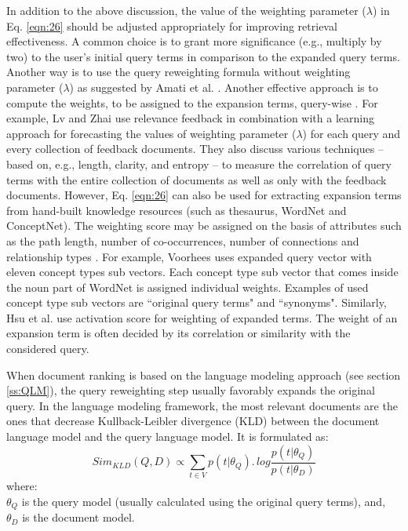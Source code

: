 In addition to the above discussion, the value of the weighting parameter ($\lambda$) in Eq. \ref{eqn:26} should be adjusted appropriately for improving retrieval effectiveness. A common choice is to grant more  significance  (e.g., multiply by two) to the user's initial query terms in comparison to the expanded query terms. Another way is to use the query reweighting formula without weighting parameter ($\lambda$) as suggested by Amati et al. \cite{amati2003probabilistic}. Another effective approach is to compute the weights, to be assigned to the expansion terms, query-wise . For example, Lv and Zhai \cite{lv2009positional,lv2010positional} use relevance feedback in combination with a learning approach for forecasting the values of weighting parameter ($\lambda$) for each query and every collection of feedback documents.  They also discuss various techniques -- based on, e.g., length, clarity, and entropy -- to measure the correlation of query terms with the entire collection of documents as well as only with the feedback documents.  
However, Eq. \ref{eqn:26} can also be used for extracting expansion terms from hand-built knowledge resources (such as thesaurus, WordNet and ConceptNet). The weighting score may be assigned on the basis of attributes such as the path length, number of co-occurrences, number of connections and relationship types \cite{jones1995interactive}. For example, Voorhees \cite{voorhees1994query} uses expanded query vector with  eleven concept types sub vectors. Each concept type sub vector that comes inside the noun part of WordNet is assigned individual weights. Examples of used concept type sub vectors are ``original query terms" and ``synonyms". Similarly, Hsu et al. \cite{hsu2008combining} use  activation score for weighting of expanded terms. The weight of an expansion term is often decided by its correlation or similarity with the considered query.

When document ranking is based on the language modeling approach (see section \ref{ss:QLM}), the query reweighting step usually favorably expands the original query. In the language modeling framework, the most relevant documents are the ones that decrease Kullback-Leibler divergence (KLD) between the document language model and the query language model. It is formulated as:
\begin{equation}\label{eqn:27}
Sim_{KLD}(Q,D)\propto\sum_{t\in V} p(t|\theta_Q).\, log\frac{p(t|\theta_Q)}{p(t|\theta_D)}
\end{equation}
where:\\
$\theta_Q$ is the query model (usually calculated using the original query terms), and,\\
$\theta_D$ is the document model. 


